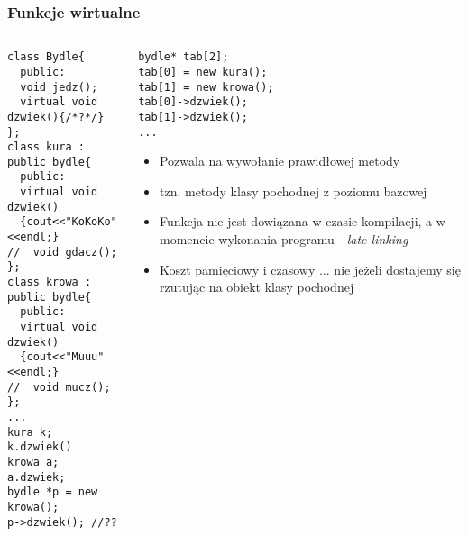 \documentclass[10pt]{beamer}
\begin{document}
\begin{frame}[fragile]
  \frametitle{Funkcje wirtualne}
  \begin{columns}
    \begin{column}{0.49\textwidth}
      \begin{lstlisting}
class Bydle{
  public:
  void jedz();
  virtual void dzwiek(){/*?*/}
};
class kura : public bydle{
  public:
  virtual void dzwiek()
  {cout<<"KoKoKo"<<endl;}
//  void gdacz();
};
class krowa : public bydle{
  public:
  virtual void dzwiek()
  {cout<<"Muuu"<<endl;}
//  void mucz();
};
...
kura k; k.dzwiek()
krowa a; a.dzwiek;
bydle *p = new krowa();
p->dzwiek(); //??
\end{lstlisting}
    \end{column}
    \begin{column}{0.49\textwidth}
\begin{lstlisting}
bydle* tab[2];
tab[0] = new kura();
tab[1] = new krowa();
tab[0]->dzwiek();
tab[1]->dzwiek();
...
\end{lstlisting}
    \begin{itemize}
  \item Pozwala na wywołanie prawidłowej metody
  \item tzn. metody klasy pochodnej z poziomu bazowej
  \item Funkcja nie jest dowiązana w czasie kompilacji, a w momencie wykonania programu - \textit{late linking}
  \item Koszt pamięciowy i czasowy ... nie jeżeli dostajemy się rzutując na obiekt klasy pochodnej
\end{itemize}
    \end{column}
  \end{columns}
\end{frame}
\end{document}
